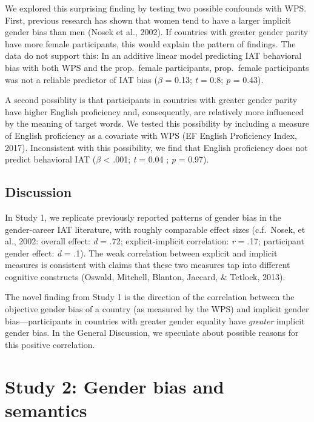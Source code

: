 \documentclass[10pt, letterpaper]{article}
\begin{document}
We explored this surprising finding by testing two possible confounds
with WPS. First, previous research has shown that women tend to have a
larger implicit gender bias than men (Nosek et al., 2002). If countries
with greater gender parity have more female participants, this would
explain the pattern of findings. The data do not support this: In an
additive linear model predicting IAT behavioral bias with both WPS and
the prop.~female participants, prop.~female participants was not a
reliable predictor of IAT bias (\(\beta\) = 0.13; \emph{t} = 0.8;
\emph{p} = 0.43).

A second possiblity is that participants in countries with greater
gender parity have higher English proficiency and, consequently, are
relatively more influenced by the meaning of target words. We tested
this possibility by including a measure of English proficiency as a
covariate with WPS (EF English Proficiency Index, 2017). Inconsistent
with this possibility, we find that English proficiency does not predict
behavioral IAT (\(\beta\) \textless{} .001; \emph{t} = 0.04 ; \emph{p} =
0.97).

\subsection{Discussion}\label{discussion}

In Study 1, we replicate previously reported patterns of gender bias in
the gender-career IAT literature, with roughly comparable effect sizes
(c.f.~Nosek, et al., 2002: overall effect: \emph{d} = .72;
explicit-implicit correlation: \emph{r} = .17; participant gender
effect: \emph{d} = .1). The weak correlation between explicit and
implicit measures is consistent with claims that these two measures tap
into different cognitive constructs (Oswald, Mitchell, Blanton, Jaccard,
\& Tetlock, 2013).

The novel finding from Study 1 is the direction of the correlation
between the objective gender bias of a country (as measured by the WPS)
and implicit gender bias---participants in countries with greater gender
equality have \emph{greater} implicit gender bias. In the General
Discussion, we speculate about possible reasons for this positive
correlation.

\section{Study 2: Gender bias and
semantics}\label{study-2-gender-bias-and-semantics}
\end{document}
